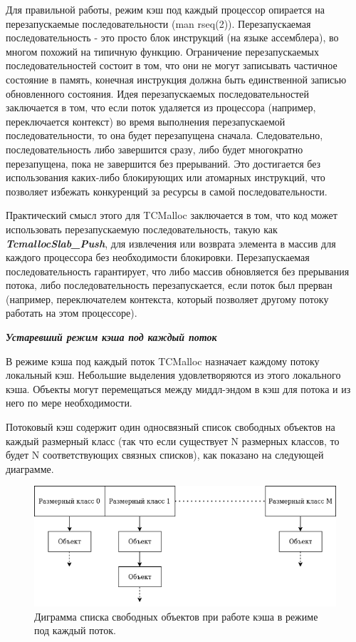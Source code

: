 Для правильной работы, режим кэш под каждый процессор опирается на перезапускаемые последовательности (man rseq(2))\cite{rseq}. Перезапускаемая последовательность - это просто блок инструкций (на языке ассемблера), во многом похожий на типичную функцию. Ограничение перезапускаемых последовательностей состоит в том, что они не могут записывать частичное состояние в память, конечная инструкция должна быть единственной записью обновленного состояния. Идея перезапускаемых последовательностей заключается в том, что если поток удаляется из процессора (например, переключается контекст) во время выполнения перезапускаемой последовательности, то она будет перезапущена сначала. Следовательно, последовательность либо завершится сразу, либо будет многократно перезапущена, пока не завершится без прерываний. Это достигается без использования каких-либо блокирующих или атомарных инструкций, что позволяет избежать конкуренций за ресурсы в самой последовательности.

Практический смысл этого для TCMalloc заключается в том, что код может использовать перезапускаемую последовательность, такую как \textbf{\textit{TcmallocSlab\_Push}}, для извлечения или возврата элемента в массив для каждого процессора без необходимости блокировки. Перезапускаемая последовательность гарантирует, что либо массив обновляется без прерывания потока, либо последовательность перезапускается, если поток был прерван (например, переключателем контекста, который позволяет другому потоку работать на этом процессоре).

\bigbreak
\textit{\textbf{Устаревший режим кэша под каждый поток}}
	
В режиме кэша под каждый поток TCMalloc назначает каждому потоку локальный кэш. Небольшие выделения удовлетворяются из этого локального кэша. Объекты могут перемещаться между миддл-эндом в кэш для потока и из него по мере необходимости.

Потоковый кэш содержит один односвязный список свободных объектов на каждый размерный класс (так что если существует N размерных классов, то будет N соответствующих связных списков), как показано на следующей диаграмме.

\begin{figure}[!h]
	\begin{center}
		\includegraphics[scale=0.6]{images/tcmalloc-per-thread.png}
		\caption{Диграмма списка свободных объектов при работе кэша в режиме под каждый поток.}
		\label{tcmalloc-per-thread}
	\end{center}
\end{figure}

